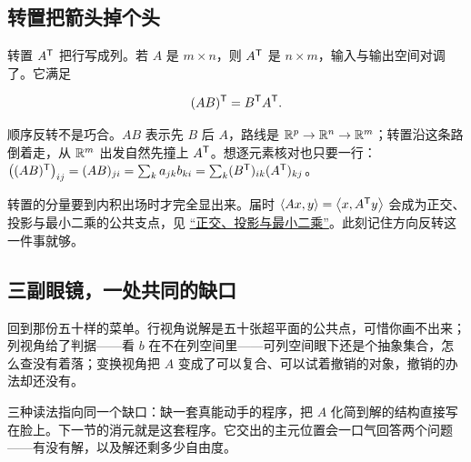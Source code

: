 \subsection{转置把箭头掉个头}

转置 \(A^{\mathsf{T}}\) 把行写成列。若 \(A\) 是 \(m\times n\)，则 \(A^{\mathsf{T}}\) 是 \(n\times m\)，输入与输出空间对调了。它满足

\[
(AB)^{\mathsf{T}}=B^{\mathsf{T}}A^{\mathsf{T}}.
\]

顺序反转不是巧合。\(AB\) 表示先 \(B\) 后 \(A\)，路线是 \(\mathbb{R}^p\to\mathbb{R}^n\to\mathbb{R}^m\)；转置沿这条路倒着走，从 \(\mathbb{R}^m\) 出发自然先撞上 \(A^{\mathsf{T}}\)。想逐元素核对也只要一行：\(\bigl((AB)^{\mathsf{T}}\bigr)_{ij}=(AB)_{ji}=\sum_k a_{jk}b_{ki}=\sum_k (B^{\mathsf{T}})_{ik}(A^{\mathsf{T}})_{kj}\)。

转置的分量要到内积出场时才完全显出来。届时 \(\left\langle Ax,y\right\rangle=\left\langle x,A^{\mathsf{T}}y\right\rangle\) 会成为正交、投影与最小二乘的公共支点，见 \hyperref[ch:018]{``正交、投影与最小二乘''}。此刻记住方向反转这一件事就够。

\subsection{三副眼镜，一处共同的缺口}

回到那份五十样的菜单。行视角说解是五十张超平面的公共点，可惜你画不出来；列视角给了判据——看 \(b\) 在不在列空间里——可列空间眼下还是个抽象集合，怎么查没有着落；变换视角把 \(A\) 变成了可以复合、可以试着撤销的对象，撤销的办法却还没有。

三种读法指向同一个缺口：缺一套真能动手的程序，把 \(A\) 化简到解的结构直接写在脸上。下一节的消元就是这套程序。它交出的主元位置会一口气回答两个问题——有没有解，以及解还剩多少自由度。
